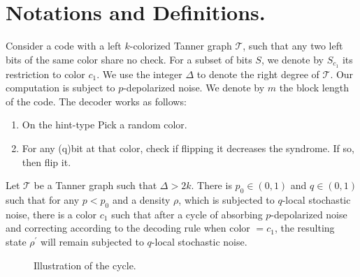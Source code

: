 \documentclass[manuscript,screen,review]{acmart}
\begin{document}
\newcommand{\TT}{ \mathcal{T} }

\section{Notations and Definitions.} 
Consider a code with a left $k$-colorized Tanner graph $\TT{}$, such that any two left bits of the same color share no check. For a subset of bits $S$, we denote by $S_{c_1}$ its restriction to color $c_1$. We use the integer $\Delta$ to denote the right degree of $\TT{}$. Our computation is subject to $p$-depolarized noise. We denote by $m$ the block length of the code. The decoder works as follows:
\begin{enumerate}
  \item On the hint-type Pick a random color. 

  \item For any (q)bit at that color, check if flipping it decreases the syndrome. If so, then flip it.
\end{enumerate}




\begin{claim}
Let $\TT$ be a Tanner graph such that $\Delta > 2k$. There is $p_{0} \in (0,1)$ and $q \in (0,1)$ such that for any $p < p_{0}$ and a density $\rho$, which is subjected to $q$-local stochastic noise, there is a color $c_{1}$ such that after a cycle of absorbing $p$-depolarized noise and correcting according to the decoding rule when color $= c_{1}$, the resulting state $\rho^\prime$ will remain subjected to $q$-local stochastic noise.
\end{claim}
\begin{figure}[h]
  \begin{center}
\end{center}
\caption{Illustration of the cycle.}
\end{figure}
\end{document}
